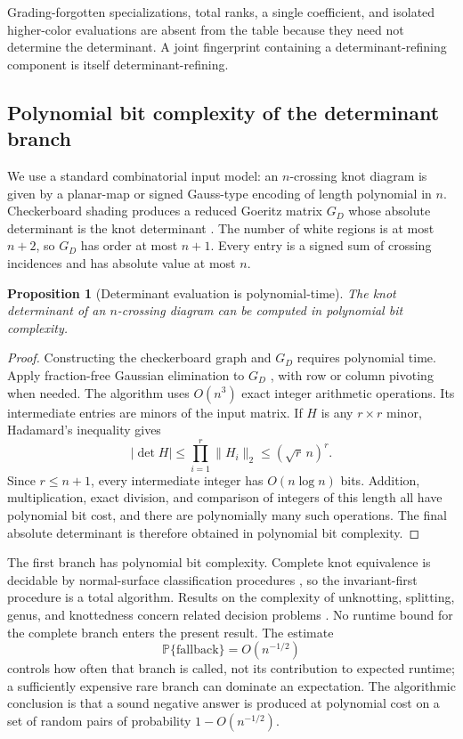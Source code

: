 \documentclass[9pt,twoside]{pnas-new}
\newtheorem{proposition}[theorem]{Proposition}
\theoremstyle{definition}
\theoremstyle{remark}
\renewcommand{\Pr}{\mathbb{P}}
\begin{document}
Grading-forgotten specializations, total ranks, a single coefficient, and isolated higher-color evaluations are absent from the table because they need not determine the determinant.  A joint fingerprint containing a determinant-refining component is itself determinant-refining.

\subsection{Polynomial bit complexity of the determinant branch}
We use a standard combinatorial input model: an $n$-crossing knot diagram is given by a planar-map or signed Gauss-type encoding of length polynomial in $n$.  Checkerboard shading produces a reduced Goeritz matrix $G_D$ whose absolute determinant is the knot determinant \cite{gordonlitherland1978}.  The number of white regions is at most $n+2$, so $G_D$ has order at most $n+1$.  Every entry is a signed sum of crossing incidences and has absolute value at most $n$.

\begin{proposition}[Determinant evaluation is polynomial-time]
\label{prop:si-det-complexity}
The knot determinant of an $n$-crossing diagram can be computed in polynomial bit complexity.
\end{proposition}

\begin{proof}
Constructing the checkerboard graph and $G_D$ requires polynomial time.  Apply fraction-free Gaussian elimination to $G_D$ \cite{bareiss1968}, with row or column pivoting when needed.  The algorithm uses $O(n^3)$ exact integer arithmetic operations.  Its intermediate entries are minors of the input matrix.  If $H$ is any $r\times r$ minor, Hadamard's inequality gives
\[
 |\det H|
 \le \prod_{i=1}^{r}\|H_i\|_2
 \le (\sqrt r\,n)^r.
\]
Since $r\le n+1$, every intermediate integer has $O(n\log n)$ bits.  Addition, multiplication, exact division, and comparison of integers of this length all have polynomial bit cost, and there are polynomially many such operations.  The final absolute determinant is therefore obtained in polynomial bit complexity.
\end{proof}

The first branch has polynomial bit complexity.  Complete knot equivalence is decidable by normal-surface classification procedures \cite{haken1961,hemion1992}, so the invariant-first procedure is a total algorithm.  Results on the complexity of unknotting, splitting, genus, and knottedness concern related decision problems \cite{hasslagariaspippenger1999,lackenby2021}.  No runtime bound for the complete branch enters the present result.  The estimate
\[
 \Pr\{\text{fallback}\}=O(n^{-1/2})
\]
controls how often that branch is called, not its contribution to expected runtime; a sufficiently expensive rare branch can dominate an expectation.  The algorithmic conclusion is that a sound negative answer is produced at polynomial cost on a set of random pairs of probability $1-O(n^{-1/2})$.
\end{document}
